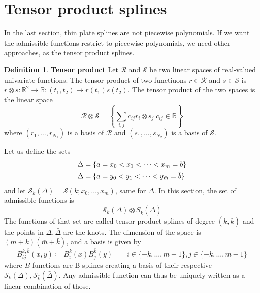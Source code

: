 \documentclass[12pt, openany]{report}
\newcommand{\R}{\mathbb{R}}
\theoremstyle{definition}
\newtheorem{definition}[thm]{Definition}
\begin{document}
\section{Tensor product splines}
In the last section, thin plate splines are not piecewise polynomials. If we want the admissible functions restrict to piecewise polynomials, we need other approaches, as the tensor product splines. \\
\begin{definition}\textbf{Tensor product}
    Let $\mathcal{R}$ and $\mathcal{S}$ be two linear spaces of real-valued univariate functions. The tensor product of two functiuons $r\in \mathcal{R}$ and $s\in \mathcal{S}$ is $r \otimes s:\R^2\rightarrow \R:(t_1,t_2)\rightarrow r(t_1)s(t_2)$. The tensor product of the two spaces is the linear space 
    \begin{equation}
        \mathcal{R}\otimes \mathcal{S} = \left\{ \sum_{i,j} c_{ij}r_i\otimes s_j| c_{ij}\in \R\right\}
    \end{equation}
    where $(r_1,\dots,r_{N_1})$ is a basis of $\mathcal{R}$ and $(s_1,\dots,s_{N_2})$ is a basis of $\mathcal{S}$.
\end{definition}
Let us define the sets 
\begin{align}
    \Delta &= \{a=x_0<x_1<\dots<x_m = b\}\\
    \Bar \Delta &= \{\bar a =y_0<y_1<\dots<y_{\bar m} = \bar b\}
\end{align}
and let $\mathcal{S}_k(\Delta)=\mathcal{S}(k;x_0,\dots,x_m)$, same for $\bar \Delta$. In this section, the set of admissible functions is 
\begin{equation}
    \mathcal{S}_k(\Delta)\otimes S_{\bar k}(\bar \Delta) 
\end{equation}
The functions of that set are called tensor product splines of degree $(k,\bar k)$ and the points in $\Delta, \bar \Delta$ are the knots. The dimension of the space is $(m+k)(\bar m+\bar k)$, and a basis is given by 
\begin{equation}
    B_{ij}^{k,\bar k}(x,y) \coloneqq B_i^k(x)B_j^{\bar k}(y) \qquad i\in \{-k,\dots,m-1\}, j\in \{-\bar k,\dots,\bar m-1\}
\end{equation}
where $B$ functions are B-splines creating a basis of their respective $\mathcal{S}_k(\Delta), \mathcal{S}_{\bar k}(\bar \Delta)$. Any admissible function can thus be uniquely written as a linear combination of those. 
\end{document}
